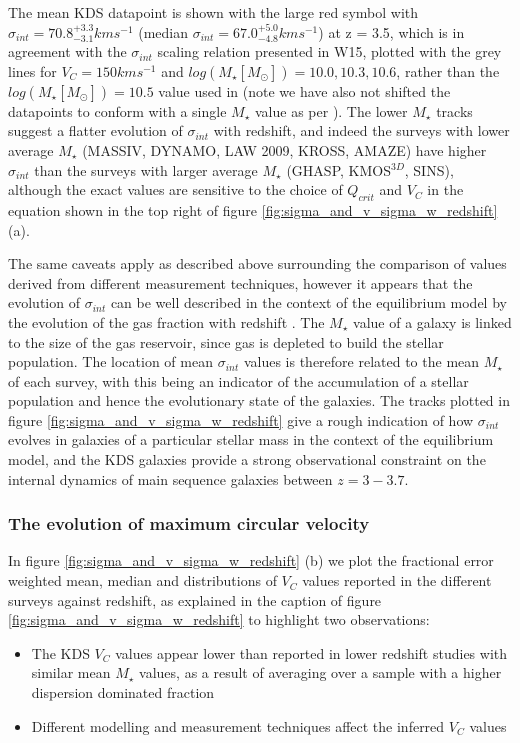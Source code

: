 \documentclass[fleqn,usenatbib]{mn2e}
\begin{document}
The mean KDS datapoint is shown with the large red symbol with $\sigma_{int} = 70.8^{+3.3}_{-3.1} kms^{-1}$ (median $\sigma_{int} = 67.0^{+5.0}_{-4.8} kms^{-1}$) at z = 3.5, which is in agreement with the $\sigma_{int}$ scaling relation presented in W15, plotted with the grey lines for $V_{C} = 150kms^{-1}$ and $log(M_{\star}[M_{\odot}])=10.0,10.3,10.6$, rather than the $log(M_{\star}[M_{\odot}])=10.5$ value used in \cite{Wisnioski2015} (note we have also not shifted the datapoints to conform with a single $M_{\star}$ value as per \cite{Wisnioski2015}).
The lower $M_{\star}$ tracks suggest a flatter evolution of $\sigma_{int}$ with redshift, and indeed the surveys with lower average $M_{\star}$ (MASSIV, DYNAMO, LAW 2009, KROSS, AMAZE) have higher $\sigma_{int}$ than the surveys with larger average $M_{\star}$ (GHASP, KMOS$^{3D}$, SINS), although the exact values are sensitive to the choice of $Q_{crit}$ and $V_{C}$ in the equation shown in the top right of figure \ref{fig:sigma_and_v_sigma_w_redshift} (a).

The same caveats apply as described above surrounding the comparison of values derived from different measurement techniques, however it appears that the evolution of $\sigma_{int}$ can be well described in the context of the equilibrium model by the evolution of the gas fraction with redshift \citep{Wisnioski2015}.
The $M_{\star}$ value of a galaxy is linked to the size of the gas reservoir, since gas is depleted to build the stellar population.
The location of mean $\sigma_{int}$ values is therefore related to the mean $M_{\star}$ of each survey, with this being an indicator of the accumulation of a stellar population and hence the evolutionary state of the galaxies.
The tracks plotted in figure \ref{fig:sigma_and_v_sigma_w_redshift} give a rough indication of how $\sigma_{int}$ evolves in galaxies of a particular stellar mass in the context of the equilibrium model, and the KDS galaxies provide a strong observational constraint on the internal dynamics of main sequence galaxies between $z=3-3.7$.

\subsubsection{The evolution of maximum circular velocity}\label{subsubsec:v_evolution}
In figure \ref{fig:sigma_and_v_sigma_w_redshift} (b) we plot the fractional error weighted mean, median and distributions of $V_{C}$ values reported in the different surveys against redshift, as explained in the caption of figure \ref{fig:sigma_and_v_sigma_w_redshift} to highlight two observations:
\begin{itemize}
    \item The KDS $V_{C}$ values appear lower than reported in lower redshift studies with similar mean $M_{\star}$ values, as a result of averaging over a sample with a higher dispersion dominated fraction
    \item Different modelling and measurement techniques affect the inferred $V_{C}$ values
\end{itemize}
\end{document}
